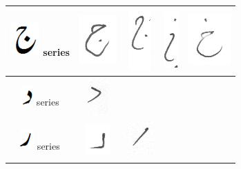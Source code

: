 \documentclass[a4paper,conference]{IEEEtran}
\begin{document}
\begin{table}[h]
\begin{tabular}{@{}ccccc@{}}
\includegraphics[scale=0.25]{jeeem} series & \includegraphics[scale=0.20]{46} & \includegraphics[scale=0.15]{47}  & \includegraphics[scale=0.15]{48} &
\includegraphics[scale=0.15]{49} \\
\hline
\includegraphics[scale=0.25]{daal_orig} series & \includegraphics[scale=0.15]{50} & & &  \\
\hline
\includegraphics[scale=0.25]{re_orig} series & \includegraphics[scale=0.15]{51} & \includegraphics[scale=0.15]{52}  & & \\

\end{tabular}
\end{table}
\end{document}
